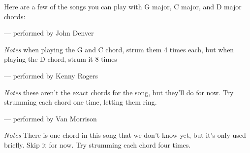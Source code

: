 Here are a few of the songs you can play with G major, C major, and D major chords: 

 --- performed by John Denver

\emph{Notes} when playing the G and C chord, strum them 4 times each, but when
playing the D chord, strum it 8 times

 --- performed by Kenny Rogers

\emph{Notes} these aren't the exact chords for the song, but they'll do for
now. Try strumming each chord one time, letting them ring.

 --- performed by Van Morrison

\emph{Notes} There is one chord in this song that we don't know yet, but it's
only used briefly. Skip it for now. Try strumming each chord four times.

